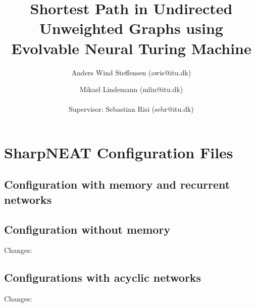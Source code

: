 \documentclass{article}
\author{Anders Wind Steffensen (awis@itu.dk)\and Mikael Lindemann (mlin@itu.dk)\\\\Supervisor: Sebastian Risi (sebr@itu.dk)}
\title{Shortest Path in Undirected Unweighted Graphs using Evolvable Neural Turing Machine}
\begin{document}

\maketitle
\tableofcontents
\listoftodos
\newpage







\clearpage


\newpage

\appendix
\section{SharpNEAT Configuration Files}
\label{appendix:sharpneat:configurations}
\subsection{Configuration with memory and recurrent networks}


\subsection{Configuration without memory}
Changes:



\subsection{Configurations with acyclic networks}
Changes:


\end{document}
